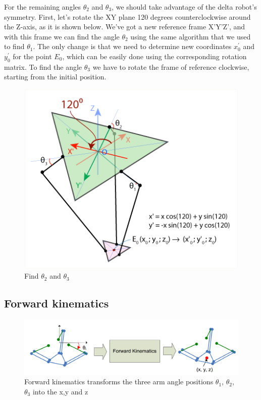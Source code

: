 For the remaining angles $\theta_{2}$ and $\theta_{3}$, we should take advantage of the delta robot's symmetry. First, let's rotate the XY plane 120 degrees counterclockwise around the Z-axis, as it is shown below. 
We've got a new reference frame X'Y'Z', and with this frame we can find the angle $\theta_{2}$ using the same algorithm that we used to find $\theta_{1}$. The only change is that we need to determine new coordinates $x^{'}_{0}$ and $y^{'}_{0}$ for the point $E_{0}$, which can be easily done using the corresponding rotation matrix. To find the angle $\theta_{3}$ we have to rotate the frame of reference clockwise, starting from the initial position.
\begin{figure}[H]
	\centering
	\includegraphics[width=\maxwidth{15cm}, keepaspectratio]{Chapters/Fig/find_theta2_and_theta3.png}
	\caption{Find $\theta_{2}$ and $\theta_{3}$}
	\label{fig:find_theta2_and_theta3}
\end{figure}

\subsection{Forward kinematics}
\begin{figure}[H]
	\centering
	\includegraphics[width=\maxwidth{15cm}, keepaspectratio]{Chapters/Fig/forward_kinematics.png}
	\caption{Forward kinematics transforms the three arm angle positions $\theta_{1}$, $\theta_{2}$, $\theta_{3}$ into the x,y and z}
	\label{fig:forward_kinematics}
\end{figure}
